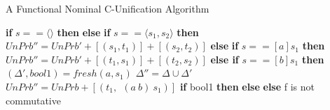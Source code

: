 \begin{frame}[allowframebreaks]{A Functional Nominal C-Unification Algorithm}
\begin{algorithmic}[1]
                \State \textbf{if} $s == \langle \rangle$ \textbf{then} 
                \State \hspace{8 \algorithmicxindent}
                \State \textbf{else} 
                \State \textbf{if} $s == \langle s_1, s_2 \rangle$ \textbf{then} 
                \State \hspace{8 \algorithmicxindent}
                $UnPrb'' = UnPrb' + [(s_1, t_1)] + [(s_2, t_2)]$
                \State \hspace{8 \algorithmicxindent}
                \State \textbf{else} 
                \State \textbf{if} $s == [a]s_1$ \textbf{then}        
                    \State \hspace{8 \algorithmicxindent}
                    $UnPrb'' = UnPrb' + [(t_1, s_1)] + [(t_2, s_2)]$
                    \State \hspace{8 \algorithmicxindent}
                \State \textbf{else if} $s == [b]s_1$ \textbf{then}        
                    \State \hspace{8 \algorithmicxindent}
                    $(\Delta', bool1) =  fresh(a, s_1)$ 
                    \State \hspace{8 \algorithmicxindent}
                    $\Delta'' = \Delta \cup \Delta'$ 
                    \State \hspace{8 \algorithmicxindent}
                    $UnPrb'' = UnPrb + [(t_1, \ \ (a \ b) \ s_1)]$ 
                    \State \hspace{8 \algorithmicxindent}
                    \textbf{if} bool1 \textbf{then} 
                    \State \hspace{16 \algorithmicxindent}
                    \State \hspace{8 \algorithmicxindent}
                    \textbf{else} 
                \State \textbf{else} 
                    \State \hspace{8 \algorithmicxindent}
             \Comment f is not commutative

\end{algorithmic}
\end{frame}
